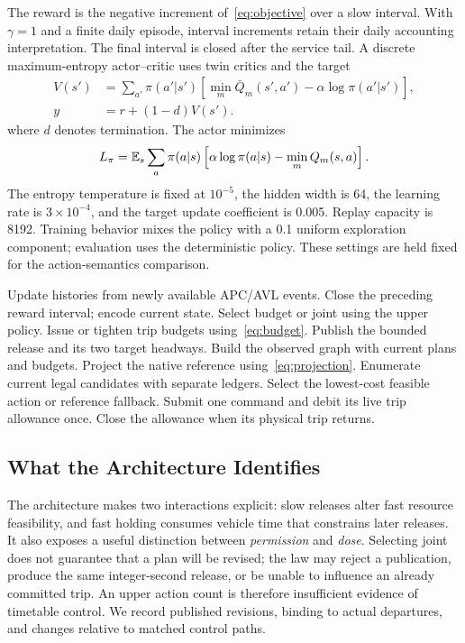 The reward is the negative increment of~\eqref{eq:objective} over a slow interval. With $\gamma=1$ and a finite daily episode, interval increments retain their daily accounting interpretation. The final interval is closed after the service tail. A discrete maximum-entropy actor--critic uses twin critics and the target
\begin{align}
 V(s')&=\sum_{a'}\pi(a'|s')\left[\min_m\bar Q_m(s',a')-\alpha\log\pi(a'|s')\right],\\
 y&=r+(1-d)V(s').
\end{align}
where $d$ denotes termination. The actor minimizes
\begin{equation}
 L_\pi=\mathbb{E}_s\sum_a\pi(a|s)\left[\alpha\log\pi(a|s)-\min_m Q_m(s,a)\right].
\end{equation}
The entropy temperature is fixed at $10^{-5}$, the hidden width is 64, the learning rate is $3\times10^{-4}$, and the target update coefficient is 0.005. Replay capacity is 8192. Training behavior mixes the policy with a 0.1 uniform exploration component; evaluation uses the deterministic policy. These settings are held fixed for the action-semantics comparison.

\begin{algorithm}[t]
\caption{One interaction cycle of FreqDuet}
\label{alg:control}
\begin{algorithmic}[1]
\STATE Update histories from newly available APC/AVL events.
\STATE Close the preceding reward interval; encode current state.
\STATE Select budget or joint using the upper policy.
\STATE Issue or tighten trip budgets using~\eqref{eq:budget}.
\STATE Publish the bounded release and its two target headways.
\ENDIF
\ENDIF
{}
\STATE Build the observed graph with current plans and budgets.
\STATE Project the native reference using~\eqref{eq:projection}.
\STATE Enumerate current legal candidates with separate ledgers.
\STATE Select the lowest-cost feasible action or reference fallback.
\STATE Submit one command and debit its live trip allowance once.
\ENDIF
\STATE Close the allowance when its physical trip returns.
\end{algorithmic}
\end{algorithm}

\subsection{What the Architecture Identifies}
The architecture makes two interactions explicit: slow releases alter fast resource feasibility, and fast holding consumes vehicle time that constrains later releases. It also exposes a useful distinction between \emph{permission} and \emph{dose}. Selecting joint does not guarantee that a plan will be revised; the law may reject a publication, produce the same integer-second release, or be unable to influence an already committed trip. An upper action count is therefore insufficient evidence of timetable control. We record published revisions, binding to actual departures, and changes relative to matched control paths.

